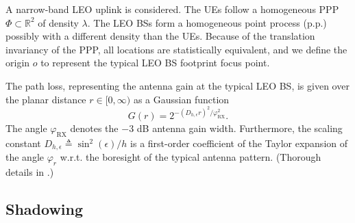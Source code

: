 \documentclass[lettersize,journal]{IEEEtran}
\newcommand{\R}{\mathbb{R}}
\newtheorem*{remark}{Remark}
\begin{document}
\label{sec:analysissec}






A narrow-band LEO  uplink is considered. The UEs follow a homogeneous PPP $\Phi \subset \R^2$ of density $\lambda$. The LEO BSs form a homogeneous point process (p.p.) possibly with a different density than the UEs. Because of the translation invariancy of the PPP, all locations are statistically equivalent, and we define the origin $\textit{o}$ to represent the typical LEO BS footprint focus point.


The path loss, representing the antenna gain at the typical LEO BS, is given over the planar distance $r \in [0, \infty)$ as a Gaussian function
  \begin{equation}
    \label{eq:Gaussianantpat}
    G(r) = 2^{-(D_{h,\epsilon}r)^2 / \varphi_{\text{RX}}^2}.
  \end{equation}
  The angle $\varphi_{\text{RX}}$ denotes the $-3$ dB antenna gain width. Furthermore, the scaling constant $D_{h,\epsilon} \triangleq \sin^2(\epsilon)/h$ is a first-order coefficient of the Taylor expansion of the angle $\varphi_r$ w.r.t. the boresight of the typical antenna pattern. (Thorough details in \cite{10909705}.) %



  
  \subsection{Shadowing}
\end{document}
